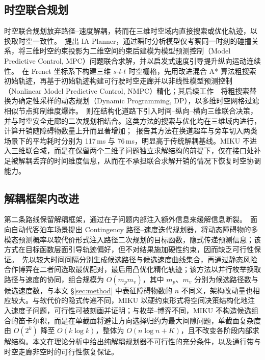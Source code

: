 \documentclass[a4paper,11pt]{ctexart}
\theoremstyle{definition}
\begin{document}
\subsection{时空联合规划}
\label{sec:related-joint}

时空联合规划放弃路径--速度解耦，转而在三维时空域内直接搜索或优化轨迹，以换取时空一致性。\citet{yang2021_ia_planner}~提出 IA Planner，通过瞬时分析模型仅考察同一时刻的碰撞关系，将三维时空约束投影为二维空间约束后建模为模型预测控制（Model Predictive Control, MPC）问题联合求解，并以启发式速度引导提升纵向运动连续性。\citet{hu2023_hybrid_astar_slt}~在 Frenet 坐标系下构建三维 $s$-$l$-$t$ 时空栅格，先用改进混合 A* 算法粗搜索初始轨迹，再基于初始轨迹构建可行驶时空走廊并以非线性模型预测控制（Nonlinear Model Predictive Control, NMPC）精化；其后续工作~\citep{hu2025_dp_nmpc}~将粗搜索替换为确定性采样的动态规划（Dynamic Programming, DP），以多维时空网格过滤相似节点抑制维度爆炸。\citet{qiao2025stjoint}~则在结构化道路下引入时间--纵向--横向三维联合决策，并与时空安全走廊的二次规划相结合。这类方法的搜索与优化均在三维域内进行，计算开销随障碍物数量上升而显著增加；\citet{hu2023_hybrid_astar_slt}~报告其方法在换道超车与旁车切入两类场景下的平均耗时分别为 117\,ms 与 76\,ms，明显高于传统解耦基线。MIKU 不进入三维联合域，而是在保留两个二维子问题独立求解结构的前提下，仅在接口处补足被解耦丢弃的时间维度信息，从而在不承担联合求解开销的情况下恢复时空协调能力。

\subsection{解耦框架内改进}
\label{sec:related-decoupled}

第二条路线保留解耦框架，通过在子问题内部注入额外信息来缓解信息断裂。\citet{han2026_contingency}~面向自动代客泊车场景提出 Contingency 路径--速度迭代规划器，将动态障碍物的多模态预测概率以软代价形式注入路径二次规划的目标函数，隐式传递预测信息；该方式在目标函数层面引导轨迹偏好，但不对结果施加硬性约束，因而缺乏可行性保证。\citet{zhang2023_dp_rcg}~先以较大时间间隔分别生成候选路径与候选速度曲线集合，再通过静态风险合作博弈在二者间选取最优配对，最后用凸优化精化轨迹；该方法以并行枚举换取路径与速度的协同，组合规模为 $O(m_p m_v)$，其中 $m_p$、$m_v$ 分别为候选路径数与候选速度数，与本文 §\ref{sec:method} 中表征障碍物数的 $n$ 不同义，架构改动量也相应较大。与软代价的隐式传递不同，MIKU 以硬约束形式将空间决策结构化地注入速度子问题，可行性可被刻画并证明；与枚举--博弈不同，MIKU 不构造候选组合的笛卡尔积，而是在单截面将避让方向选择归约为最大间隙问题，单截面复杂度由 $O(2^k)$ 降至 $O(k\log k)$，整体为 $O(n\log n + K)$，且不改变各阶段内部求解结构。本文在理论分析中给出纯解耦规划器不可行性的充分条件，以及通行带与时空走廊非空时的可行性恢复保证。
\end{document}
